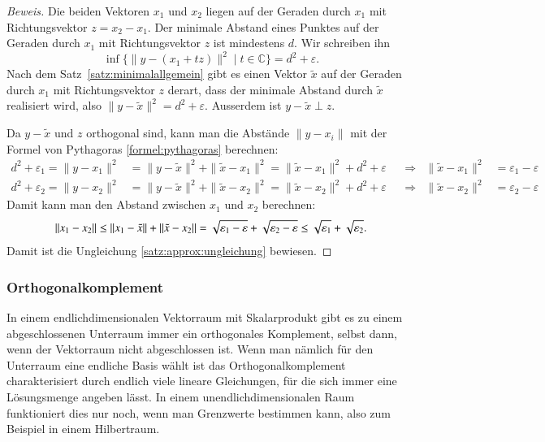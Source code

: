 \begin{proof}[Beweis]
Die beiden Vektoren $x_1$ und $x_2$ liegen auf der Geraden durch $x_1$ 
mit Richtungsvektor $z=x_2-x_1$.
Der minimale Abstand eines Punktes auf der Geraden durch $x_1$ mit 
Richtungsvektor $z$ ist mindestens $d$.
Wir schreiben ihn
\[
\inf \{ \|y- (x_1+tz)\|^2 \;|\; t\in \mathbb C\}
=
d^2 + \varepsilon.
\]
Nach dem Satz~\ref{satz:minimalallgemein} gibt es einen Vektor $\tilde{x}$
auf der Geraden durch $x_1$ mit Richtungsvektor $z$ derart, dass der minimale
Abstand durch $\tilde{x}$ realisiert wird, also
$\|y-\tilde{x}\|^2 = d^2+\varepsilon$.
Ausserdem ist $y-\tilde{x}\perp z$.

Da $y-\tilde{x}$ und $z$ orthogonal sind, kann man die Abstände
$\|y-x_i\|$ mit der Formel von Pythagoras \eqref{formel:pythagoras}
berechnen:
\begin{align*}
d^2 + \varepsilon_1
=
\|y-x_1\|^2 &= \|y-\tilde{x}\|^2 + \|\tilde{x}-x_1\|^2
=
\|\tilde{x}-x_1\|^2 + d^2 + \varepsilon
&&\Rightarrow&
\|\tilde{x}-x_1\|^2&=\varepsilon_1-\varepsilon
\\
d^2 + \varepsilon_2
=
\|y-x_2\|^2 &= \|y-\tilde{x}\|^2 + \|\tilde{x}-x_2\|^2
=
\|\tilde{x}-x_2\|^2 + d^2 + \varepsilon
&&\Rightarrow&
\|\tilde{x}-x_2\|^2&=\varepsilon_2-\varepsilon
\end{align*}
Damit kann man den Abstand zwischen $x_1$ und $x_2$ berechnen:
\[
\|x_1-x_2\|
\le
\|x_1-\tilde{x}\| + \| \tilde{x}-x_2\|
=
\sqrt{\mathstrut\varepsilon_1-\varepsilon}
+
\sqrt{\mathstrut\varepsilon_2-\varepsilon}
\le
\sqrt{\mathstrut\varepsilon_1} + \sqrt{\mathstrut\varepsilon_2}.
\]
Damit ist die Ungleichung \ref{satz:approx:ungleichung} bewiesen.
\end{proof}

\subsubsection{Orthogonalkomplement}
In einem endlichdimensionalen Vektorraum mit Skalarprodukt gibt es zu
einem abgeschlossenen Unterraum immer ein orthogonales Komplement,
selbst dann, wenn der Vektorraum nicht abgeschlossen ist.
Wenn man nämlich für den Unterraum eine endliche Basis wählt ist das
Orthogonalkomplement charakterisiert durch endlich viele lineare 
Gleichungen, für die sich immer eine Lösungsmenge angeben lässt.
In einem unendlichdimensionalen Raum funktioniert dies nur noch, wenn
man Grenzwerte bestimmen kann, also zum Beispiel in einem Hilbertraum.


